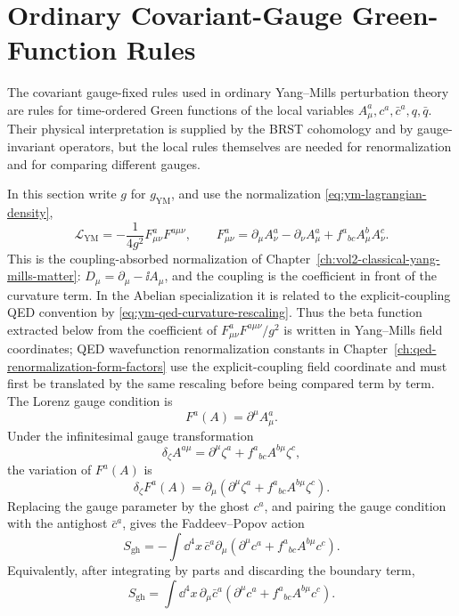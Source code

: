 \section{Ordinary Covariant-Gauge Green-Function Rules}

The covariant gauge-fixed rules used in ordinary Yang--Mills perturbation
theory are rules for time-ordered Green functions of the local variables
\(A_\mu^a,c^a,\bar c^a,q,\bar q\).  Their physical interpretation is supplied
by the BRST cohomology and by gauge-invariant operators, but the local rules
themselves are needed for renormalization and for comparing different gauges.

In this section write \(g\) for \(g_{\mathrm{YM}}\), and use the normalization
\eqref{eq:ym-lagrangian-density},
\[
  \mathcal L_{\mathrm{YM}}
  =
  -\frac1{4g^2}F^a_{\mu\nu}F^{a\mu\nu},
  \qquad
  F^a_{\mu\nu}
  =
  \partial_\mu A^a_\nu-\partial_\nu A^a_\mu
  +f^a{}_{bc}A^b_\mu A^c_\nu .
\]
This is the coupling-absorbed normalization of
Chapter~\ref{ch:vol2-classical-yang-mills-matter}:
\(D_\mu=\partial_\mu-\ii A_\mu\), and the
coupling is the coefficient in front of the curvature term.  In the Abelian
specialization it is related to the explicit-coupling QED convention by
\eqref{eq:ym-qed-curvature-rescaling}.  Thus the beta function extracted below
from the coefficient of \(F^a_{\mu\nu}F^{a\mu\nu}/g^2\) is written in
Yang--Mills field coordinates; QED wavefunction renormalization constants in
Chapter~\ref{ch:qed-renormalization-form-factors} use the explicit-coupling
field coordinate and must first be translated by the same rescaling before
being compared term by term.
The Lorenz gauge condition is
\[
  F^a(A)=\partial^\mu A_\mu^a .
\]
Under the infinitesimal gauge transformation
\[
  \delta_\zeta A^{a\mu}
  =
  \partial^\mu\zeta^a+f^a{}_{bc}A^{b\mu}\zeta^c ,
\]
the variation of \(F^a(A)\) is
\[
  \delta_\zeta F^a(A)
  =
  \partial_\mu
  \left(\partial^\mu\zeta^a+f^a{}_{bc}A^{b\mu}\zeta^c\right).
\]
Replacing the gauge parameter by the ghost \(c^a\), and pairing the gauge
condition with the antighost \(\bar c^a\), gives the Faddeev--Popov action
\begin{equation}
  S_{\mathrm{gh}}
  =
  -\int\dd^4x\,
  \bar c^a\partial_\mu
  \left(\partial^\mu c^a+f^a{}_{bc}A^{b\mu}c^c\right).
  \label{eq:qcd-ordinary-ghost-action}
\end{equation}
Equivalently, after integrating by parts and discarding the boundary term,
\[
  S_{\mathrm{gh}}
  =
  \int\dd^4x\,
  \partial_\mu\bar c^a
  \left(\partial^\mu c^a+f^a{}_{bc}A^{b\mu}c^c\right).
\]
